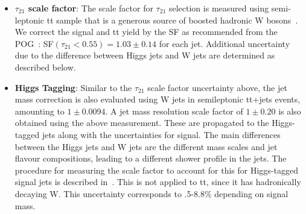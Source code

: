\begin{itemize}
\item \textbf{$\tau_{21}$ scale factor}: The scale factor for $\tau_{21}$ selection is measured using semi-leptonic tt sample that is a generous source of boosted hadronic W bosons~\cite{CMS-AN-17-051}. We correct the signal and tt yield by the SF as recommended from the POG~\cite{Wtagging}: SF$(\tau_{21} < 0.55) = 1.03 \pm 0.14$ for each jet. Additional uncertainty due to the difference between Higgs jets and W jets are determined as described below.
  
\item \textbf{Higgs Tagging}: Similar to the $\tau_{21}$ scale factor uncertainty above, the jet mass correction is also evaluated using W jets in semileptonic tt+jets events, amounting to $1 \pm 0.0094$. A jet mass resolution scale factor of $1 \pm 0.20$ is also obtained using the above measurement. These are propagated to the Higgs-tagged jets along with the uncertainties for signal.
The main differences between the Higgs jets and W jets are the different mass scales and jet flavour compositions, leading to a different shower profile in the jets. The procedure for measuring the scale factor to account for this for Higgs-tagged signal jets is described in~\cite{CMS-PAS-B2G-16-026}.
This is not applied to tt, since it has hadronically decaying W. This uncertainty corresponds to .5-8.8\% depending on signal mass.


\end{itemize}

